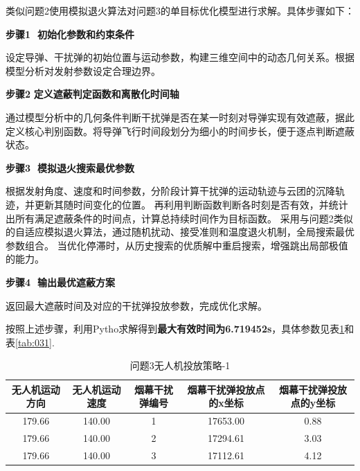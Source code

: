 \documentclass[../main.tex]{subfiles}
\begin{document}

类似问题2使用模拟退火算法对问题3的单目标优化模型进行求解。具体步骤如下：

\noindent\textbf{步骤1 $\,\,$初始化参数和约束条件} 

设定导弹、干扰弹的初始位置与运动参数，构建三维空间中的动态几何关系。根据模型分析对发射参数设定合理边界。

\noindent\textbf{步骤2$\,\,$定义遮蔽判定函数和离散化时间轴}

通过模型分析中的几何条件判断干扰弹是否在某一时刻对导弹实现有效遮蔽，据此定义核心判别函数。将导弹飞行时间段划分为细小的时间步长，便于逐点判断遮蔽状态。

\noindent\textbf{步骤3 $\,\,$模拟退火搜索最优参数} 

根据发射角度、速度和时间参数，分阶段计算干扰弹的运动轨迹与云团的沉降轨迹，并更新其随时间变化的位置。
再利用判断函数判断各时刻是否有效，并统计出所有满足遮蔽条件的时间点，计算总持续时间作为目标函数。
采用与问题2类似的自适应模拟退火算法，通过随机扰动、接受准则和温度退火机制，全局搜索最优参数组合。
当优化停滞时，从历史搜索的优质解中重启搜索，增强跳出局部极值的能力。

\noindent\textbf{步骤4 $\,\,$输出最优遮蔽方案} 

返回最大遮蔽时间及对应的干扰弹投放参数，完成优化求解。

按照上述步骤，利用Pytho求解得到\textbf{最大有效时间为6.719452s}，具体参数见表\ref{tab:001}和表\ref{tab:031}.
\begin{table}[H]
\caption{问题3无人机投放策略-1}
\label{tab:001} 
\centering
\begin{small}
\begin{tabular}{ccccc}
\toprule[1.5pt]
无人机运动方向 & 无人机运动速度 & 烟幕干扰弹编号 & 烟幕干扰弹投放点的x坐标& 烟幕干扰弹投放点的y坐标 \\
\midrule[1pt]
  179.66           &140.00                  & 1     & 17653.00                   & 0.88     \\            
  179.66           &140.00                  & 2     & 17294.61                   & 3.03      \\           
  179.66          &140.00                  & 3     & 17112.61                   & 4.12      \\           
\bottomrule[1.5pt]
\end{tabular}
\end{small}
\end{table}
\end{document}
